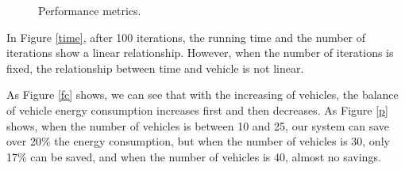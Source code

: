\documentclass[conference]{IEEEtran}
\begin{document}
	
	\begin{figure}[htbp]
		\centering
		\quad
		\caption{Performance metrics. }
	\end{figure}
	
	In Figure \ref{time}, after 100 iterations, the running time and the number of iterations show a linear relationship. However, when the number of iterations is fixed, the relationship between time and vehicle is not linear. 
	
	As Figure \ref{fc} shows, we can see that with the increasing of vehicles, the balance of vehicle energy consumption increases first and then decreases. 
	As Figure \ref{p} shows, when the number of vehicles is between 10 and 25, our system can save over 20\% the energy consumption, but when the number of vehicles is 30, only 17\% can be saved, and when the number of vehicles is 40, almost no savings. 
	
\end{document}
